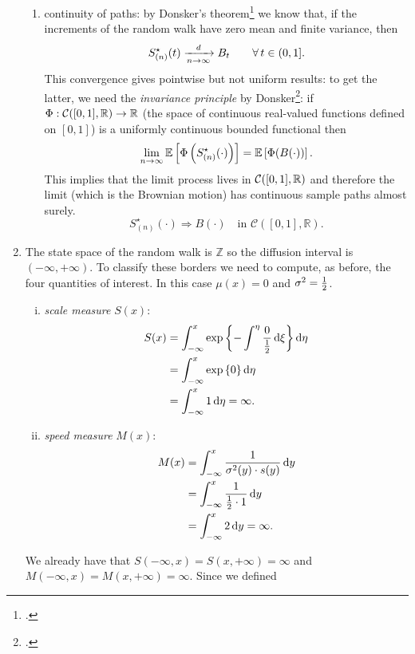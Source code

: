 \documentclass[12pt]{article}
\begin{document}
\begin{enumerate}
\begin{enumerate}[\circnum]
			\item continuity of paths: by Donsker's theorem\footcite[198]{rene} we know that, if the increments of the random walk have zero mean and finite variance, then 
			\begin{equation*}
				S^{\star}_{(n)}(t)\xrightarrow[n\to\infty]{d}B_{t}\qquad\forall\, t\in(0,1].
			\end{equation*}
			This convergence gives pointwise but not uniform results: to get the latter, we need the \textit{invariance principle} by Donsker\footcite[199]{rene}: if $\Phi:\mathcal{C}([0,1],\mathbb{R})\to\mathbb{R}$ (the space of continuous real-valued functions defined on $[0,1]$) is a uniformly continuous bounded functional then
			\begin{equation*}
				\lim_{n\to\infty}\mathbb{E}\left[\Phi\left(S^{\star}_{(n)}(\cdot)\right)\right]=\mathbb{E}\left[\Phi(B(\cdot))\right].
			\end{equation*}
			This implies that the limit process lives in $\mathcal{C}([0,1],\mathbb{R})$ and therefore the limit (which is the Brownian motion) has continuous sample paths almost surely.
			\[
			S^{\star}_{(n)}(\cdot) \Rightarrow B(\cdot)
			\quad \text{in } \mathcal{C}([0,1], \mathbb{R}).
			\]
		\end{enumerate}
		\item The state space of the random walk is $\mathbb{Z}$ so the diffusion interval is $(-\infty,+\infty)$. To classify these borders we need to compute, as before, the four quantities of interest. In this case $\mu(x)=0$ and $\sigma^{2}=\frac{1}{2}$.
		\begin{enumerate}[i)]
			\item \textit{scale measure} $S(x)$:
			\begin{align*}
				S(x)&=\int^{x}_{-\infty}\exp\left\{-\int^{\eta}\frac{0}{\frac{1}{2}}\mathop{}\!\mathrm{d}\xi\right\}\mathop{}\!\mathrm{d}\eta\\
				&=\int^{x}_{-\infty}\exp\left\{0\right\}\mathop{}\!\mathrm{d}\eta\\
				&=\int^{x}_{-\infty}1\mathop{}\!\mathrm{d}\eta=\infty.
			\end{align*}
			\item \textit{speed measure} $M(x)$:
			\begin{align*}
				M(x)&=\int_{-\infty}^{x}\frac{1}{\sigma^{2}(y)\cdot s(y)}\mathop{}\!\mathrm{d} y\\
				&=\int_{-\infty}^{x}\frac{1}{\frac{1}{2}\cdot 1}\mathop{}\!\mathrm{d} y\\
				&=\int_{-\infty}^{x}2\mathop{}\!\mathrm{d} y=\infty.
			\end{align*}
		\end{enumerate}
		We already have that $S(-\infty,x)=S(x,+\infty)=\infty$ and $M(-\infty,x)=M(x,+\infty)=\infty$. Since we defined

\end{enumerate}
\end{document}
